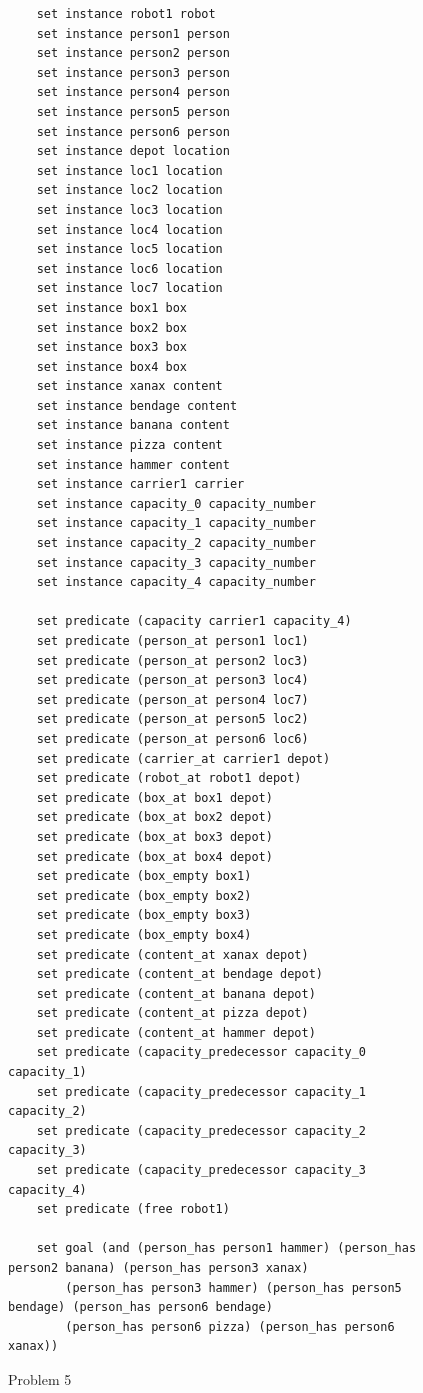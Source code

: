 \begin{figure}[h!]
    \small
    \begin{verbatim}
    set instance robot1 robot
    set instance person1 person
    set instance person2 person
    set instance person3 person
    set instance person4 person
    set instance person5 person
    set instance person6 person
    set instance depot location
    set instance loc1 location
    set instance loc2 location
    set instance loc3 location
    set instance loc4 location
    set instance loc5 location
    set instance loc6 location
    set instance loc7 location
    set instance box1 box
    set instance box2 box
    set instance box3 box
    set instance box4 box
    set instance xanax content
    set instance bendage content
    set instance banana content
    set instance pizza content
    set instance hammer content
    set instance carrier1 carrier
    set instance capacity_0 capacity_number
    set instance capacity_1 capacity_number
    set instance capacity_2 capacity_number
    set instance capacity_3 capacity_number
    set instance capacity_4 capacity_number

    set predicate (capacity carrier1 capacity_4)
    set predicate (person_at person1 loc1)
    set predicate (person_at person2 loc3)
    set predicate (person_at person3 loc4)
    set predicate (person_at person4 loc7)
    set predicate (person_at person5 loc2)
    set predicate (person_at person6 loc6)
    set predicate (carrier_at carrier1 depot)
    set predicate (robot_at robot1 depot)
    set predicate (box_at box1 depot)
    set predicate (box_at box2 depot)
    set predicate (box_at box3 depot)
    set predicate (box_at box4 depot)
    set predicate (box_empty box1)
    set predicate (box_empty box2)
    set predicate (box_empty box3)
    set predicate (box_empty box4)
    set predicate (content_at xanax depot)
    set predicate (content_at bendage depot)
    set predicate (content_at banana depot)
    set predicate (content_at pizza depot)
    set predicate (content_at hammer depot)
    set predicate (capacity_predecessor capacity_0 capacity_1)
    set predicate (capacity_predecessor capacity_1 capacity_2)
    set predicate (capacity_predecessor capacity_2 capacity_3)
    set predicate (capacity_predecessor capacity_3 capacity_4)
    set predicate (free robot1)

    set goal (and (person_has person1 hammer) (person_has person2 banana) (person_has person3 xanax) 
        (person_has person3 hammer) (person_has person5 bendage) (person_has person6 bendage) 
        (person_has person6 pizza) (person_has person6 xanax))

    \end{verbatim}
    \caption{Problem 5}
    \label{problem5_problem}
\end{figure}

